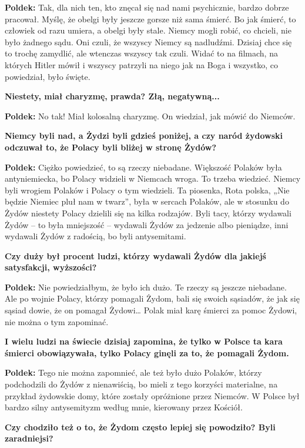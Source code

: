 \begin{otherlanguage}{polish}
\textbf{Poldek:} Tak, dla nich ten, kto znęcał się nad nami psychicznie, bardzo dobrze pracował. Myślę, że obelgi były jeszcze gorsze niż sama śmierć. Bo jak śmierć, to człowiek od razu umiera, a obelgi były stale. Niemcy mogli robić, co chcieli, nie było żadnego sądu. Oni czuli, że wszyscy Niemcy są nadludźmi. Dzisiaj chce się to trochę zamydlić, ale wtenczas wszyscy tak czuli. Widać to na filmach, na których Hitler mówił i wszyscy patrzyli na niego jak na Boga i wszystko, co powiedział, było święte. 
  
\textbf{Niestety, miał charyzmę, prawda? Złą, negatywną... }

\textbf{Poldek:} No tak! Miał kolosalną charyzmę. On wiedział, jak mówić do Niemców.

\textbf{Niemcy byli nad, a Żydzi byli gdzieś poniżej, a czy naród żydowski odczuwał to, że Polacy byli bliżej w stronę Żydów?}
 
\textbf{Poldek:}  Ciężko powiedzieć, to są rzeczy niebadane. Większość Polaków była antyniemiecka, bo Polacy widzieli w Niemcach wroga. To trzeba wiedzieć. Niemcy byli wrogiem Polaków i Polacy o tym wiedzieli. Ta piosenka, Rota polska, „Nie będzie Niemiec pluł nam w twarz”, była w sercach Polaków, ale w stosunku do Żydów niestety Polacy dzielili się na kilka rodzajów. Byli tacy, którzy wydawali Żydów – to była mniejszość – wydawali Żydów za jedzenie albo pieniądze, inni wydawali Żydów z radością, bo byli antysemitami.

\textbf{Czy duży był procent ludzi, którzy wydawali Żydów dla jakiejś satysfakcji, wyższości?}
 
\textbf{Poldek:} Nie powiedziałbym, że było ich dużo. Te rzeczy są jeszcze niebadane. Ale po wojnie Polacy, którzy pomagali Żydom, bali się swoich sąsiadów, że jak się sąsiad dowie, że on pomagał Żydowi… Polak miał karę śmierci za pomoc Żydowi, nie można o tym zapominać.

\textbf{I wielu ludzi na świecie dzisiaj zapomina, że tylko w Polsce ta kara śmierci obowiązywała, tylko Polacy ginęli za to, że pomagali Żydom.}

\textbf{Poldek:} Tego nie można zapomnieć, ale też było dużo Polaków, którzy podchodzili do Żydów z nienawiścią, bo mieli z tego korzyści materialne, na przykład żydowskie domy, które zostały opróżnione przez Niemców. W Polsce był bardzo silny antysemityzm według mnie, kierowany przez Kościół.
   
\textbf{Czy chodziło też o to, że Żydom często lepiej się powodziło? Byli zaradniejsi?}


\end{otherlanguage}
